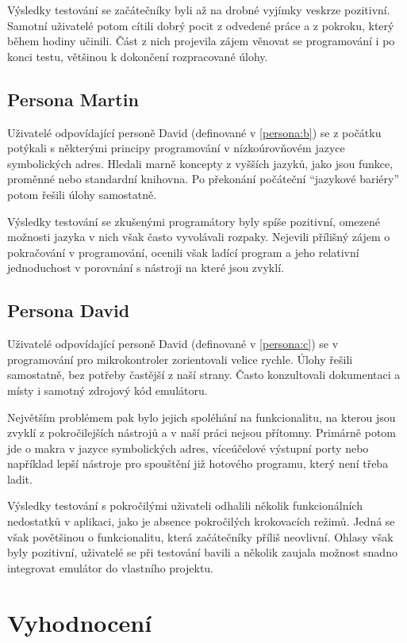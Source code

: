 Výsledky testování se začátečníky byli až na drobné vyjímky veskrze pozitivní. Samotní uživatelé potom cítili dobrý pocit z odvedené práce a z pokroku, který během hodiny učinili. Část z nich projevila zájem věnovat se programování i po konci testu, většinou k dokončení rozpracované úlohy.

\subsection{Persona Martin}

Uživatelé odpovídající personě David (definované v \ref{persona:b}) se z počátku potýkali s některými principy programování v nízkoúrovňovém jazyce symbolických adres. Hledali marně koncepty z vyšších jazyků, jako jsou funkce, proměnné nebo standardní knihovna. Po překonání počáteční ``jazykové bariéry'' potom řešili úlohy samostatně.

Výsledky testování se zkušenými programátory byly spíše pozitivní, omezené možnosti jazyka v nich však často vyvolávali rozpaky. Nejevili přílišný zájem o pokračování v programování, ocenili však ladící program a jeho relativní jednoduchost v porovnání s nástroji na které jsou zvyklí.

\subsection{Persona David}

Uživatelé odpovídající personě David (definované v \ref{persona:c}) se v programování pro mikrokontroler zorientovali velice rychle. Úlohy řešili samostatně, bez potřeby častější z naší strany. Často konzultovali dokumentaci a místy i samotný zdrojový kód emulátoru.

Největším problémem pak bylo jejich spoléhání na funkcionalitu, na kterou jsou zvyklí z pokročilejších nástrojů a v naší práci nejsou přítomny. Primárně potom jde o makra v jazyce symbolických adres, víceúčelové výstupní porty nebo například lepší nástroje pro spouštění již hotového programu, který není třeba ladit.

Výsledky testování s pokročilými uživateli odhalili několik funkcionálních nedostatků v aplikaci, jako je absence pokročilých krokovacích režimů. Jedná se však povětšinou o funkcionalitu, která začátečníky příliš neovlivní. Ohlasy však byly pozitivní, uživatelé se při testování bavili a několik zaujala možnost snadno integrovat emulátor do vlastního projektu.

\section{Vyhodnocení}

